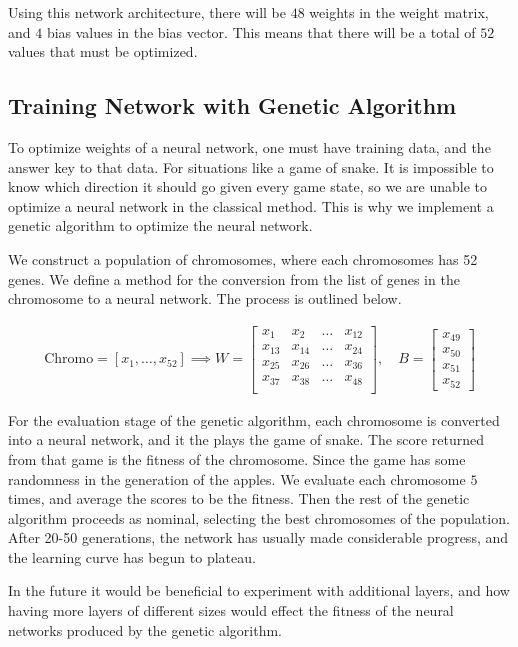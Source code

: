 \documentclass{amsart}
\begin{document}
Using this network architecture, there will be $48$ weights in the weight
matrix, and $4$ bias values in the bias vector. This means that there will be a
total of $52$ values that must be optimized.


\subsection{Training Network with Genetic Algorithm}

To optimize weights of a neural network, one must have training data, and the
answer key to that data. For situations like a game of snake. It is impossible
to know which direction it should go given every game state, so we are unable
to optimize a neural network in the classical method. This is why we implement
a genetic algorithm to optimize the neural network.

We construct a population of chromosomes, where each chromosomes has 52 genes.
We define a method for the conversion from the list of genes in the chromosome
to a neural network. The process is outlined below.

\begin{align*}
  \text{Chromo}=\left[x_1,\ldots,x_{52}\right]\implies
  W=\begin{bmatrix}
    x_1 & x_2 & \ldots & x_{12}\\
    x_{13} & x_{14} & \ldots & x_{24}\\
    x_{25} & x_{26} & \ldots & x_{36}\\
    x_{37} & x_{38} & \ldots & x_{48}\\
    \end{bmatrix},\quad B=\begin{bmatrix}
    x_{49} \\ x_{50} \\ x_{51} \\ x_{52}
  \end{bmatrix}
\end{align*}

For the evaluation stage of the genetic algorithm, each chromosome is converted
into a neural network, and it the plays the game of snake. The score returned
from that game is the fitness of the chromosome. Since the game has some
randomness in the generation of the apples. We evaluate each chromosome $5$
times, and average the scores to be the fitness. Then the rest of the genetic
algorithm proceeds as nominal, selecting the best chromosomes of the
population. After 20-50 generations, the network has usually made considerable
progress, and the learning curve has begun to plateau.

In the future it would be beneficial to experiment with additional layers, and
how having more layers of different sizes would effect the fitness of the
neural networks produced by the genetic algorithm.

\nocite{*}


\end{document}
